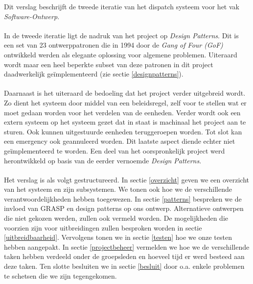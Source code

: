 Dit verslag beschrijft de tweede iteratie van het dispatch systeem voor het vak \textit{Software-Ontwerp}.
\paragraph{}
In de tweede iteratie ligt de nadruk van het project op \textit{Design Patterns}. Dit is een set van 23 ontwerppatronen die in 1994 door de \textit{Gang of Four (GoF)} ontwikkeld werden als elegante oplossing voor algemene problemen. Uiteraard wordt maar een heel beperkte subset van deze patronen in dit project daadwerkelijk ge\"implementeerd (zie sectie \ref{designpatterns}).
\paragraph{}
Daarnaast is het uiteraard de bedoeling dat het project verder uitgebreid wordt. Zo dient het systeem door middel van een beleidsregel, zelf voor te stellen wat er moet gedaan worden voor het verdelen van de eenheden. Verder wordt ook een extern systeem op het systeem gezet dat in staat is machinaal het project aan te sturen. Ook kunnen uitgestuurde eenheden teruggeroepen worden. Tot slot kan een emergency ook geannuleerd worden. Dit laatste aspect diende echter niet ge\"implementeerd te worden.
Een deel van het oorspronkelijk project werd herontwikkeld op basis van de eerder vernoemde \textit{Design Patterns}.
\paragraph{}
Het verslag is als volgt gestructureerd. In sectie \ref{overzicht} geven we een overzicht van het systeem en zijn subsystemen.
We tonen ook hoe we de verschillende verantwoordelijkheden hebben toegewezen.
In sectie \ref{patterns} bespreken we de invloed van GRASP en design patterns op ons ontwerp.
Alternatieve ontwerpen die niet gekozen werden, zullen ook vermeld worden.
De mogelijkheden die voorzien zijn voor uitbreidingen zullen besproken worden in sectie \ref{uitbreidbaarheid}.
Vervolgens tonen we in sectie \ref{testen} hoe we onze testen hebben aangepakt.
In sectie \ref{projectbeheer} vermelden we hoe we de verschillende taken hebben verdeeld onder de groepsleden
en hoeveel tijd er werd besteed aan deze taken.
Ten slotte besluiten we in sectie \ref{besluit} door o.a. enkele problemen te schetsen die we zijn tegengekomen.
